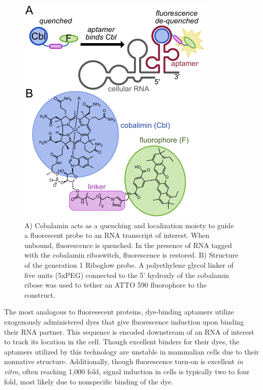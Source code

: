 \begin{figure}
\begin{centering}
\includegraphics[width=\textwidth]{figures/fig1v2.pdf}

\end{centering}
\footnotesize
\caption{\label{figure:riboglow}
A) Cobalamin acts as a quenching and localization moiety to guide a fluorescent probe to an RNA transcript of interest. When unbound, fluorescence is quenched. In the presence of RNA tagged with the cobalamin riboswitch, fluorescence is restored. B) Structure of the generation 1 Riboglow probe. A polyethylene glycol linker of five units (5xPEG) connected to the 5' hydroxly of the cobalamin ribose was used to tether an ATTO 590 fluorophore to the construct.
}
\end{figure}

The most analogous to fluoresecent proteins, dye-binding aptamers utilize exogenously administered dyes that give fluorescence induction upon binding their RNA partner\cite{PaigeRNAMimicsGreen2011,FilonovBroccoliRapidSelection2014,AutourFluorogenicRNAMango2018,DolgosheinaRNAMangoAptamerFluorophore2014}.
This sequence is encoded downstream of an RNA of interest to track its location in the cell. Though excellent binders for their dyes, the aptamers utilized by this technology are unstable in mammalian cells due to their nonnative structure\cite{EtzelSyntheticRiboswitchesPlug2017}. %
Additionally, though fluorescence turn-on is excellent \textit{in vitro}, often reaching 1,000 fold, signal induction in cells is typically two to four fold, most likely due to nonspecific binding of the dye.

